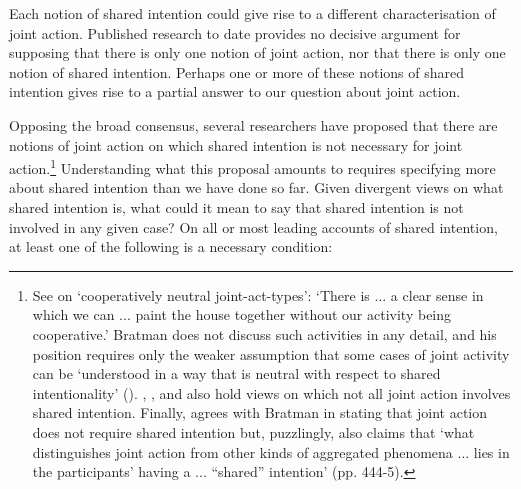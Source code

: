 \documentclass[12pt,a4paper]{extarticle}
\begin{document}
Each notion of shared intention could give rise to a different characterisation of joint action.
Published research to date provides no decisive argument for supposing that there is only one notion of joint action, nor that there is only one notion of shared intention.
Perhaps one or more of these notions of shared intention gives rise to a partial answer to our question about joint action.


Opposing the broad consensus, several researchers have proposed that there are notions of joint action on which shared intention is not necessary for joint action.\footnote{
See \citet[p.\ 330]{Bratman:1992mi} on `cooperatively neutral joint-act-types': `There is ... a clear sense in which we can ... paint the house together without our activity being cooperative.'  Bratman does not discuss such activities in any detail, and his position requires only the weaker assumption that some cases of joint activity can be `understood in a way that is neutral with respect to shared intentionality' (\citeyear[p.\ 147]{Bratman:1999fr}).  \citet{chant_unintentional_2007}, \citet{ludwig_collective_2007}, and \citet[p. 7]{schmidt_understanding_2010} also hold views on which not all joint action involves shared intention.
Finally, \citet[p. 448 fn. 17]{alonso_shared_2009} agrees with Bratman in stating that joint action does not require shared intention but, puzzlingly, also claims that `what distinguishes joint action from other kinds of aggregated phenomena ... lies in the participants' having a ... ``shared'' intention' (pp. 444-5).
} 
Understanding what this proposal amounts to requires specifying more about shared intention than we have done so far.
Given divergent views on what shared intention is, what could it mean to  say that shared intention is not involved in any given case?  
On all or most leading accounts of shared intention, at least one of the following is a necessary condition:
\end{document}
